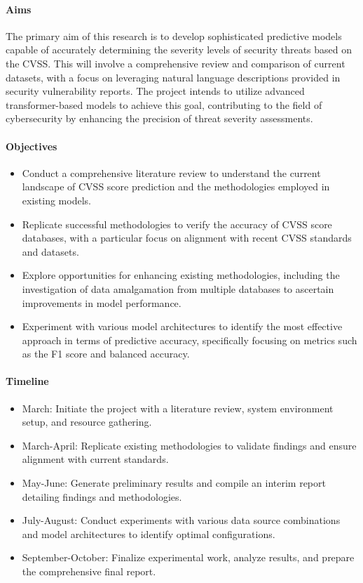 \documentclass[11pt]{article}
\begin{document}
\paragraph{Aims}
The primary aim of this research is to develop sophisticated predictive models capable of accurately determining
the severity levels of security threats based on the CVSS. This will involve a comprehensive review and comparison
of current datasets, with a focus on leveraging natural language descriptions provided in security vulnerability reports.
The project intends to utilize advanced transformer-based models to achieve this goal, contributing to the field of
cybersecurity by enhancing the precision of threat severity assessments.

\paragraph{Objectives}
\begin{itemize}[noitemsep]
	\item Conduct a comprehensive literature review to understand the current landscape of CVSS score prediction and the methodologies employed in existing models.
	\item Replicate successful methodologies to verify the accuracy of CVSS score databases, with a particular focus on alignment with recent CVSS standards and datasets.
	\item Explore opportunities for enhancing existing methodologies, including the investigation of data amalgamation from multiple databases to ascertain improvements in model performance.
	\item Experiment with various model architectures to identify the most effective approach in terms of predictive accuracy, specifically focusing on metrics such as the F1 score and balanced accuracy.
\end{itemize}

\paragraph{Timeline}
\begin{itemize}[noitemsep]
	\item March: Initiate the project with a literature review, system environment setup, and resource gathering.
	\item March-April: Replicate existing methodologies to validate findings and ensure alignment with current standards.
	\item May-June: Generate preliminary results and compile an interim report detailing findings and methodologies.
	\item July-August: Conduct experiments with various data source combinations and model architectures to identify optimal configurations.
	\item September-October: Finalize experimental work, analyze results, and prepare the comprehensive final report.
\end{itemize}

\noindent
\end{document}
